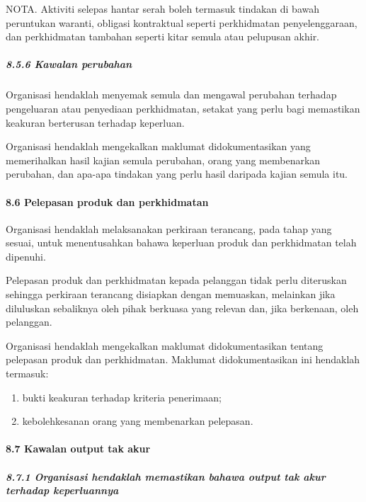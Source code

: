 \documentclass[
]{article}
\begin{document}
NOTA. Aktiviti selepas hantar serah boleh termasuk tindakan di bawah
peruntukan waranti, obligasi kontraktual seperti perkhidmatan
penyelenggaraan, dan perkhidmatan tambahan seperti kitar semula atau
pelupusan akhir.

\hypertarget{kawalan-perubahan}{%
\subparagraph{8.5.6 Kawalan perubahan}\label{kawalan-perubahan}}

Organisasi hendaklah menyemak semula dan mengawal perubahan terhadap
pengeluaran atau penyediaan perkhidmatan, setakat yang perlu bagi
memastikan keakuran berterusan terhadap keperluan.

Organisasi hendaklah mengekalkan maklumat didokumentasikan yang
memerihalkan hasil kajian semula perubahan, orang yang membenarkan
perubahan, dan apa-apa tindakan yang perlu hasil daripada kajian semula
itu.

\hypertarget{pelepasan-produk-dan-perkhidmatan}{%
\paragraph{8.6 Pelepasan produk dan
perkhidmatan}\label{pelepasan-produk-dan-perkhidmatan}}

Organisasi hendaklah melaksanakan perkiraan terancang, pada tahap yang
sesuai, untuk menentusahkan bahawa keperluan produk dan perkhidmatan
telah dipenuhi.

Pelepasan produk dan perkhidmatan kepada pelanggan tidak perlu
diteruskan sehingga perkiraan terancang disiapkan dengan memuaskan,
melainkan jika diluluskan sebaliknya oleh pihak berkuasa yang relevan
dan, jika berkenaan, oleh pelanggan.

Organisasi hendaklah mengekalkan maklumat didokumentasikan tentang
pelepasan produk dan perkhidmatan. Maklumat didokumentasikan ini
hendaklah termasuk:

\begin{enumerate}
\def\labelenumi{\alph{enumi})}
\item
  bukti keakuran terhadap kriteria penerimaan;
\item
  kebolehkesanan orang yang membenarkan pelepasan.
\end{enumerate}

\hypertarget{kawalan-output-tak-akur}{%
\paragraph{8.7 Kawalan output tak akur}\label{kawalan-output-tak-akur}}

\hypertarget{organisasi-hendaklah-memastikan-bahawa-output-tak-akur-terhadap-keperluannya}{%
\subparagraph{8.7.1 Organisasi hendaklah memastikan bahawa output tak
akur terhadap
keperluannya}\label{organisasi-hendaklah-memastikan-bahawa-output-tak-akur-terhadap-keperluannya}}
\end{document}
